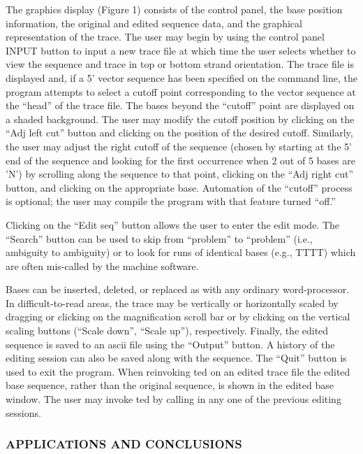 	The graphics display (Figure 1) consists of the control 
panel, the base position information, the original and edited sequence 
data, and the graphical representation of the trace.  The user may 
begin by using the control panel INPUT button to input a new trace 
file at which time the user selects whether to view the sequence
and trace in top or bottom strand orientation.
The trace file is displayed and, if a 5' vector sequence has been 
specified on the command line, the program attempts to select a 
cutoff point corresponding to the vector sequence at the ``head'' of the 
trace file.  The bases beyond the ``cutoff'' point are  
displayed on a shaded background.  The user may modify the cutoff 
position by clicking on the ``Adj left cut'' button and clicking on the 
position of the desired cutoff.  Similarly, the user may adjust the 
right cutoff of the sequence (chosen by starting at the 5' end of the 
sequence and looking for the first occurrence when 2 out of 5 bases 
are 'N') by scrolling along the sequence to that point, clicking on the 
``Adj right cut'' button, and clicking on the appropriate base.  
Automation of the ``cutoff'' process is optional; the user may compile 
the program with that feature turned ``off.'' 

	Clicking on the ``Edit seq'' button allows the user to enter the edit 
mode.  The ``Search'' button can be used to skip from ``problem'' to 
``problem'' (i.e., ambiguity to ambiguity) or to look for runs of 
identical bases (e.g., TTTT) which are often mis-called by
the machine software.

  Bases can be inserted, deleted, or replaced as with
any ordinary word-processor.  In difficult-to-read areas,  
the trace may be vertically or horizontally scaled by dragging or 
clicking on the magnification scroll bar or by clicking on the 
vertical scaling buttons (``Scale down'', ``Scale up''), respectively.  
Finally, the edited sequence is saved to an ascii file using the 
``Output'' button.  A history of the editing session can also be saved
along with the sequence. 
The ``Quit'' button is used 
to exit the program.  When reinvoking ted on an edited trace file the 
edited base sequence, rather than the original sequence, is shown in 
the edited base window.  The user may invoke ted by calling in any one 
of the previous editing sessions.   


\subsubsection*{APPLICATIONS AND CONCLUSIONS}

